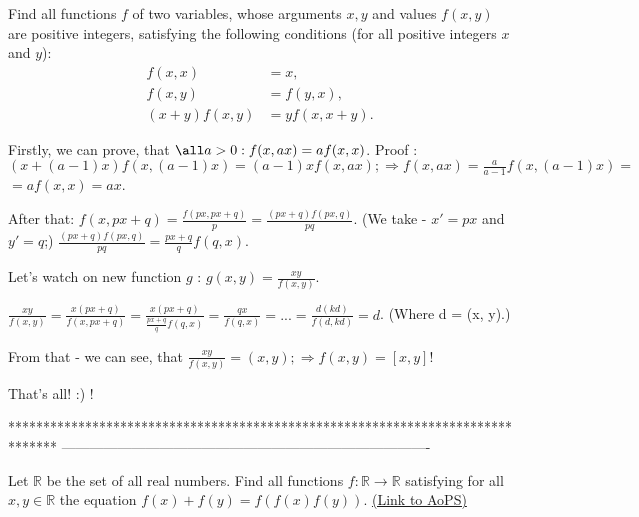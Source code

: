 \begin{solution}
	\begin{tcolorbox}Find all functions $f$ of two variables, whose arguments $x,y$ and values $f(x,y)$ are positive integers, satisfying the following conditions (for all positive integers $x$ and $y$):
\begin{align*} f(x,x)& =x,\\ f(x,y)& =f(y,x),\\ (x+y)f(x,y)& =yf(x,x+y).\end{align*}\end{tcolorbox}
Firstly, we can prove, that $\all a > 0 : f(x, ax) = af(x, x)$.
Proof : 
$(x + (a - 1)x)f(x, (a - 1)x) = (a - 1)xf(x,ax); \Rightarrow f(x, ax) = \frac{a}{a - 1}f(x, (a - 1)x) =$
$=af(x, x) = ax$.

After that:
$f(x, px + q) = \frac{f(px, px + q)}{p} = \frac{(px + q)f(px, q)}{pq}$. (We take - $x' = px$ and $y' = q$;)
$\frac{(px + q)f(px, q)}{pq} = \frac{px + q}{q}f(q, x)$.

Let's watch on new function $g$ : $g(x, y) = \frac{xy}{f(x, y)}$.

$\frac{xy}{f(x, y)} = \frac{x(px + q)}{f(x, px + q)} = \frac{x(px + q)}{\frac{px + q}{q}f(q, x)} = \frac{qx}{f(q, x)} = ... = \frac{d(kd)}{f(d, kd)} = d$. (Where d = (x, y).)

From that - we can see, that $\frac{xy}{f(x, y)} = (x, y); \Rightarrow f(x, y) = [x, y]$!

That's all!  :) !
\end{solution}
*******************************************************************************
-------------------------------------------------------------------------------

\begin{problem}
	Let $\mathbb{R}$ be the set of all real numbers. Find all functions $f:\mathbb{R}\rightarrow\mathbb{R}$ satisfying for all $x,y\in\mathbb{R}$ the equation $f(x)+f(y)=f(f(x)f(y))$.
	\flushright \href{https://artofproblemsolving.com/community/c6h385996}{(Link to AoPS)}
\end{problem}



